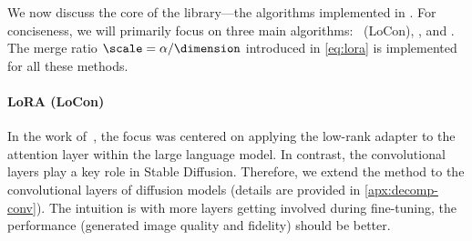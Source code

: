 We now discuss the core of the library---the algorithms implemented in \lycoris. 
For conciseness, we will primarily focus on three main algorithms: \lora~(LoCon), \loha, and \lokr. 
The merge ratio $\scale=\alpha/\dimension$ introduced in \eqref{eq:lora} is implemented for all these methods.


\paragraph{LoRA (LoCon)\afterhead}
In the work of~\cite{hu2021lora}, the focus was centered on applying the low-rank adapter to the attention layer within the large language model. In contrast, the convolutional layers play a key role in Stable Diffusion. Therefore, we extend the method to the convolutional layers of diffusion models (details are provided in \cref{apx:decomp-conv}).
The intuition is with more layers getting involved during fine-tuning, the performance (generated image quality and fidelity) should be better. 


